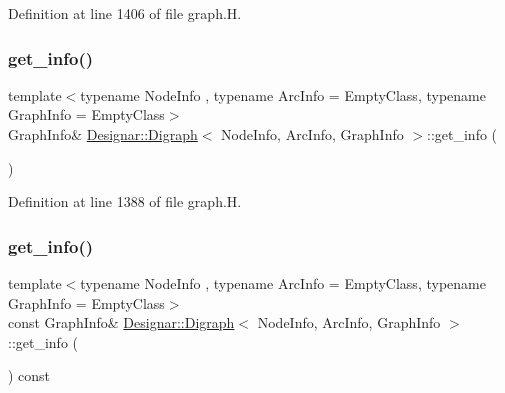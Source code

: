 Definition at line 1406 of file graph.\+H.

\mbox{\label{class_designar_1_1_digraph_a530d2befede0eede246d9eed6c05f1f6}} 
\subsubsection{\texorpdfstring{get\+\_\+info()}{get\_info()}\hspace{0.1cm}{\footnotesize\ttfamily [1/2]}}
{\footnotesize\ttfamily template$<$typename Node\+Info , typename Arc\+Info  = Empty\+Class, typename Graph\+Info  = Empty\+Class$>$ \\
Graph\+Info\& \hyperlink{class_designar_1_1_digraph}{Designar\+::\+Digraph}$<$ Node\+Info, Arc\+Info, Graph\+Info $>$\+::get\+\_\+info (\begin{DoxyParamCaption}{ }\end{DoxyParamCaption})\hspace{0.3cm}{\ttfamily [inline]}}



Definition at line 1388 of file graph.\+H.

\mbox{\label{class_designar_1_1_digraph_a113a9f5a392795312a2d0c0d5c86041c}} 
\subsubsection{\texorpdfstring{get\+\_\+info()}{get\_info()}\hspace{0.1cm}{\footnotesize\ttfamily [2/2]}}
{\footnotesize\ttfamily template$<$typename Node\+Info , typename Arc\+Info  = Empty\+Class, typename Graph\+Info  = Empty\+Class$>$ \\
const Graph\+Info\& \hyperlink{class_designar_1_1_digraph}{Designar\+::\+Digraph}$<$ Node\+Info, Arc\+Info, Graph\+Info $>$\+::get\+\_\+info (\begin{DoxyParamCaption}{ }\end{DoxyParamCaption}) const\hspace{0.3cm}{\ttfamily [inline]}}




